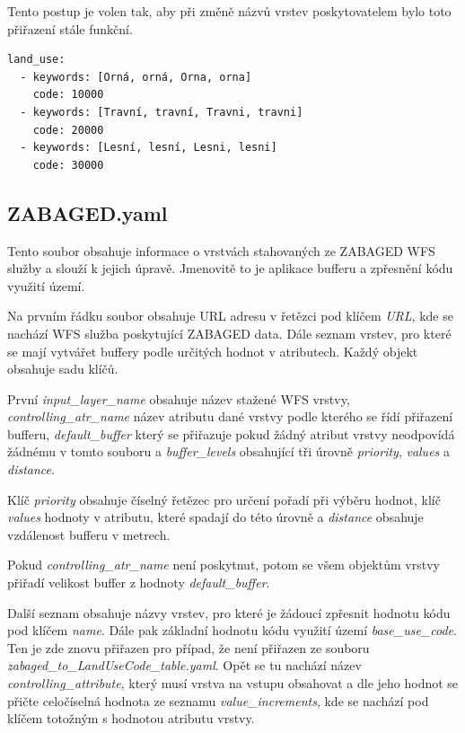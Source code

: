 \documentclass[a4paper,oneside,12pt]{book}
\begin{document}
\hspace{10mm}Tento postup je volen tak, aby při změně názvů vrstev poskytovatelem bylo toto přiřazení stále funkční.

\begin{lstlisting}[style=myyaml, caption={Ukázka zabaged\_to\_LandUseCode\_table.yaml},label={kod:zabaged_to_LandUseCode_table.yaml}]
land_use:
  - keywords: [Orná, orná, Orna, orna]
    code: 10000
  - keywords: [Travní, travní, Travni, travni]
    code: 20000
  - keywords: [Lesní, lesní, Lesni, lesni]
    code: 30000
\end{lstlisting}

\subsection{ZABAGED.yaml} \label{ZABAGED.yaml}
\hspace{10mm} Tento soubor obsahuje informace o vrstvách stahovaných ze ZABAGED WFS služby a slouží k jejich úpravě. Jmenovitě to je aplikace bufferu a zpřesnění kódu využití území.

\hspace{10mm}Na prvním řádku soubor obsahuje URL adresu v řetězci pod klíčem \textit{URL}, kde se nachází WFS služba poskytující ZABAGED data. Dále seznam vrstev, pro které se mají vytvářet buffery podle určitých hodnot v atributech. Každý objekt obsahuje sadu klíčů.

\hspace{10mm}První \textit{input\_layer\_name} obsahuje název stažené WFS vrstvy, \newline \textit{controlling\_atr\_name} název atributu dané vrstvy podle kterého se řídí přiřazení bufferu, \textit{default\_buffer} který se přiřazuje pokud žádný atribut vrstvy neodpovídá žádnému v tomto souboru a \textit{buffer\_levels} obsahující tři úrovně \textit{priority}, \textit{values} a \textit{distance}.

\hspace{10mm}Klíč \textit{priority} obsahuje číselný řetězec pro určení pořadí při výběru hodnot, klíč \textit{values} hodnoty v atributu, které spadají do této úrovně a \textit{distance} obsahuje vzdálenost bufferu v metrech.

\hspace{10mm}Pokud \textit{controlling\_atr\_name} není poskytnut, potom se všem objektům vrstvy přiřadí velikost buffer z hodnoty \textit{default\_buffer}.

\hspace{10mm}Další seznam obsahuje názvy vrstev, pro které je žádoucí zpřesnit hodnotu kódu pod klíčem \textit{name}. Dále pak základní hodnotu kódu využití území \textit{base\_use\_code}. Ten je zde znovu přiřazen pro případ, že není přiřazen ze souboru  \newline \textit{zabaged\_to\_LandUseCode\_table.yaml}. Opět se tu nachází název \textit{controlling\_attribute}, který musí vrstva na vstupu obsahovat a dle jeho hodnot se přičte celočíselná hodnota ze seznamu \textit{value\_increments}, kde se nachází pod klíčem totožným s hodnotou atributu vrstvy. 
\end{document}
